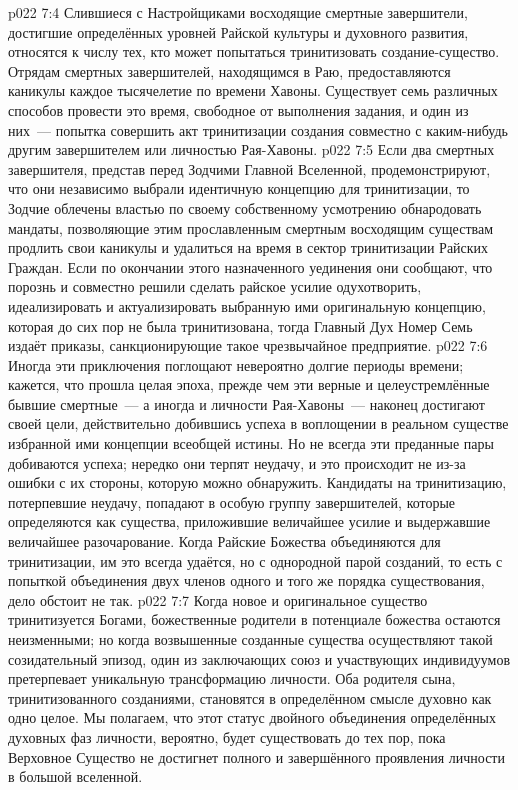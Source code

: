 \vs p022 7:4 Слившиеся с Настройщиками восходящие смертные завершители, достигшие определённых уровней Райской культуры и духовного развития, относятся к числу тех, кто может попытаться тринитизовать создание\hyp{}существо. Отрядам смертных завершителей, находящимся в Раю, предоставляются каникулы каждое тысячелетие по времени Хавоны. Существует семь различных способов провести это время, свободное от выполнения задания, и один из них~--- попытка совершить акт тринитизации создания совместно с каким\hyp{}нибудь другим завершителем или личностью Рая\hyp{}Хавоны.
\vs p022 7:5 Если два смертных завершителя, представ перед Зодчими Главной Вселенной, продемонстрируют, что они независимо выбрали идентичную концепцию для тринитизации, то Зодчие облечены властью по своему собственному усмотрению обнародовать мандаты, позволяющие этим прославленным смертным восходящим существам продлить свои каникулы и удалиться на время в сектор тринитизации Райских Граждан. Если по окончании этого назначенного уединения они сообщают, что порознь и совместно решили сделать райское усилие одухотворить, идеализировать и актуализировать выбранную ими оригинальную концепцию, которая до сих пор не была тринитизована, тогда Главный Дух Номер Семь издаёт приказы, санкционирующие такое чрезвычайное предприятие.
\vs p022 7:6 Иногда эти приключения поглощают невероятно долгие периоды времени; кажется, что прошла целая эпоха, прежде чем эти верные и целеустремлённые бывшие смертные~--- а иногда и личности Рая\hyp{}Хавоны~--- наконец достигают своей цели, действительно добившись успеха в воплощении в реальном существе избранной ими концепции всеобщей истины. Но не всегда эти преданные пары добиваются успеха; нередко они терпят неудачу, и это происходит не из\hyp{}за ошибки с их стороны, которую можно обнаружить. Кандидаты на тринитизацию, потерпевшие неудачу, попадают в особую группу завершителей, которые определяются как существа, приложившие величайшее усилие и выдержавшие величайшее разочарование. Когда Райские Божества объединяются для тринитизации, им это всегда удаётся, но с однородной парой созданий, то есть с попыткой объединения двух членов одного и того же порядка существования, дело обстоит не так.
\vs p022 7:7 \pc Когда новое и оригинальное существо тринитизуется Богами, божественные родители в потенциале божества остаются неизменными; но когда возвышенные созданные существа осуществляют такой созидательный эпизод, один из заключающих союз и участвующих индивидуумов претерпевает уникальную трансформацию личности. Оба родителя сына, тринитизованного созданиями, становятся в определённом смысле духовно как одно целое. Мы полагаем, что этот статус двойного объединения определённых духовных фаз личности, вероятно, будет существовать до тех пор, пока Верховное Существо не достигнет полного и завершённого проявления личности в большой вселенной.

